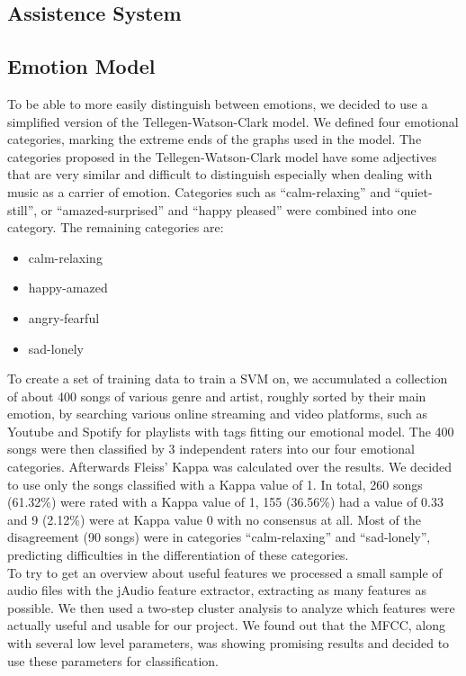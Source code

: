 \begin{multicols}{2}
\subsection{Assistence System}
\subsection{Emotion Model}
To be able to more easily distinguish between emotions, we decided to use a simplified version of the Tellegen-Watson-Clark model. We defined four emotional categories, marking the extreme ends of the graphs used in the model. The categories proposed in the Tellegen-Watson-Clark model have some adjectives that are very similar and difficult to distinguish especially when dealing with music as a carrier of emotion. Categories such as “calm-relaxing” and “quiet-still”, or “amazed-surprised” and “happy pleased” were combined into one category. The remaining categories are:

\begin{itemize}
	\item calm-relaxing
	\item happy-amazed
	\item angry-fearful
	\item sad-lonely
\end{itemize}

To create a set of training data to train a SVM on, we accumulated a collection of about 400 songs of various genre and artist, roughly sorted by their main emotion, by searching various online streaming and video platforms, such as Youtube and Spotify for playlists with tags fitting our emotional model.
The 400 songs were then classified by 3 independent raters into our four emotional categories. Afterwards Fleiss’ Kappa was calculated over the results. We decided to use only the songs classified with a Kappa value of 1. In total, 260 songs (61.32\%) were rated with a Kappa value of 1, 155 (36.56\%) had a value of 0.33 and 9 (2.12\%) were at Kappa value 0 with no consensus at all. Most of the disagreement (90 songs) were in categories “calm-relaxing” and “sad-lonely”, predicting difficulties in the differentiation of these categories.\\

To try to get an overview about useful features we processed a small sample of audio files with the jAudio feature extractor, extracting as many features as possible. We then used a two-step cluster analysis to analyze which features were actually useful and usable for our project. We found out that the MFCC, along with several low level parameters, was showing promising results and decided to use these parameters for classification.


\end{multicols}
